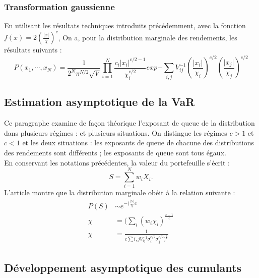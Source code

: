 \documentclass{article}
\begin{document}
  \subsubsection{Transformation gaussienne}
  En utilisant les résultats techniques introduits précédemment, avec la fonction $ f(x)=2(\frac{\vert x\vert}{\chi})^{c} $, On a, pour la distribution marginale des rendements, les résultats suivants :
  \begin{equation}
  P(x_{1},\cdots ,x_{N})=\frac{1}{2^{N}\pi ^{N/2}\sqrt{V}}\prod ^{N}_{i=1}\frac{c_{i}\vert x_{i}\vert ^{c/2-1}}{\chi _{i}^{c/2}}exp{-\sum _{i,j}V_{ij}^{-1}(\frac{\vert x_{i}\vert}{\chi_{i}})^{c/2}(\frac{\vert x_{j}\vert}{\chi_{j}})^{c/2}}
  \end{equation}
  \subsection{Estimation asymptotique de la VaR}
   Ce paragraphe examine de façon théorique l'exposant de queue de la distribution dans plusieurs régimes : et plusieurs situations. On distingue les régimes $ c>1 $ et $ c<1 $ et les deux situations : les exposants de queue de chacune des distributions des rendements sont différents ; les exposants de queue sont tous égaux.\\
 En conservant les notations précédentes, la valeur du portefeuille s'écrit :
 \begin{equation}
 S=\sum ^{N}_{i=1}w_{i}X_{i}.
 \end{equation}
    L'article montre que la distribution marginale obéit à la relation suivante : 
    \begin{align}
	P(S) &\sim e^{-(\frac{\vert S \vert}{\chi}c}\\
    \chi &= (\sum _{i}(w_{i}\chi _{i})^{\frac{c-1}{c}}\\
    \chi &= \frac{1}{c\sum i,jV_{ij}^{-1}\sigma_{i}^{c/2}\sigma ^{c/2}_{j})^{\frac{1}{c}}}
    \end{align}
 \subsection{Développement asymptotique des cumulants}
\end{document}
